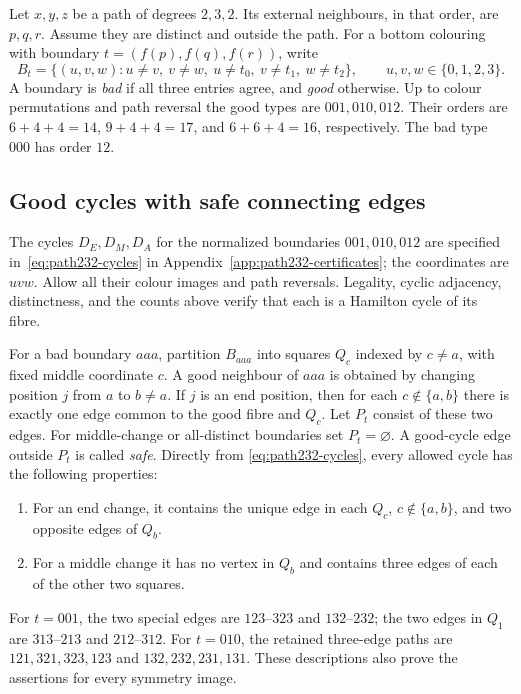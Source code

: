 \documentclass[11pt]{article}
\theoremstyle{remark}
\numberwithin{equation}{section}
\numberwithin{table}{section}
\begin{document}
Let $x,y,z$ be a path of degrees $2,3,2$.  Its external neighbours, in
that order, are $p,q,r$.  Assume they are distinct and outside the path.
For a bottom colouring with boundary $t=(f(p),f(q),f(r))$, write
\[
 B_t=\{(u,v,w):u\ne v,\ v\ne w,\ u\ne t_0,\ v\ne t_1,
                  \ w\ne t_2\},\qquad u,v,w\in\{0,1,2,3\}.
\]
A boundary is \emph{bad} if all three entries agree, and \emph{good}
otherwise. Up to colour permutations and path reversal the good types
are $001,010,012$. Their orders are $6+4+4=14$, $9+4+4=17$, and
$6+6+4=16$, respectively. The bad type $000$ has order $12$.

\subsection{Good cycles with safe connecting edges}
The cycles $D_E,D_M,D_A$ for the normalized boundaries $001,010,012$
are specified in~\eqref{eq:path232-cycles} in
Appendix~\ref{app:path232-certificates}; the coordinates are $uvw$.
Allow all their colour images and path reversals. Legality, cyclic adjacency, distinctness, and the counts
above verify that each is a Hamilton cycle of its fibre.

For a bad boundary $aaa$, partition $B_{aaa}$ into squares $Q_c$ indexed
by $c\ne a$, with fixed middle coordinate $c$. A good neighbour of
$aaa$ is obtained by changing position $j$ from $a$ to $b\ne a$.
If $j$ is an end position, then for each $c\notin\{a,b\}$ there is
exactly one edge common to the good fibre and $Q_c$. Let $P_t$ consist
of these two edges. For middle-change or all-distinct boundaries set
$P_t=\varnothing$. A good-cycle edge outside $P_t$ is called \emph{safe}.
Directly from \eqref{eq:path232-cycles}, every allowed cycle has the following properties:
\begin{enumerate}
\item For an end change, it contains the unique edge in each
      $Q_c$, $c\notin\{a,b\}$, and two opposite edges of $Q_b$.
\item For a middle change it has no vertex in $Q_b$ and contains
      three edges of each of the other two squares.
\end{enumerate}
For $t=001$, the two special edges are $123$--$323$ and $132$--$232$;
the two edges in $Q_1$ are $313$--$213$ and $212$--$312$.
For $t=010$, the retained three-edge paths are
$121,321,323,123$ and $132,232,231,131$.
These descriptions also prove the assertions for every symmetry image.
\end{document}
